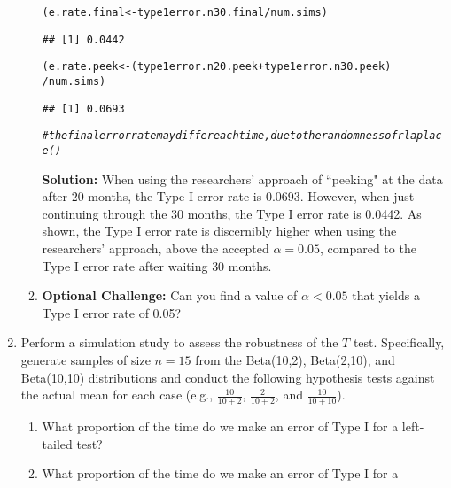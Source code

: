 \documentclass{article}\usepackage[]{graphicx}\usepackage[]{xcolor}
\makeatletter
\newcommand{\hlcom}[1]{\textcolor[rgb]{0.678,0.584,0.686}{\textit{#1}}}%
\newcommand{\hlopt}[1]{\textcolor[rgb]{0,0,0}{#1}}%
\newcommand{\hldef}[1]{\textcolor[rgb]{0.345,0.345,0.345}{#1}}%
\newcommand{\hlkwb}[1]{\textcolor[rgb]{0.69,0.353,0.396}{#1}}%
\newenvironment{kframe}{%
 \def\at@end@of@kframe{}%
 \ifinner\ifhmode%
  \def\at@end@of@kframe{\end{minipage}}%
  \begin{minipage}{\columnwidth}%
 \fi\fi%
 \def\FrameCommand##1{\hskip\@totalleftmargin \hskip-\fboxsep
 \colorbox{shadecolor}{##1}\hskip-\fboxsep
     \hskip-\linewidth \hskip-\@totalleftmargin \hskip\columnwidth}%
 \MakeFramed {\advance\hsize-\width
   \@totalleftmargin\z@ \linewidth\hsize
   \@setminipage}}%
 {\par\unskip\endMakeFramed%
 \at@end@of@kframe}
\newenvironment{knitrout}{}{} %
\makeatother
\begin{document}
\begin{enumerate}
\begin{enumerate}
\begin{knitrout}
\begin{kframe}
\begin{alltt}
\hldef{(e.rate.final} \hlkwb{<-} \hldef{type1error.n30.final}\hlopt{/}\hldef{num.sims)}
\end{alltt}
\begin{verbatim}
## [1] 0.0442
\end{verbatim}
\begin{alltt}
\hldef{(e.rate.peek} \hlkwb{<-} \hldef{(type1error.n20.peek} \hlopt{+} \hldef{type1error.n30.peek)}
              \hlopt{/}\hldef{num.sims)}
\end{alltt}
\begin{verbatim}
## [1] 0.0693
\end{verbatim}
\begin{alltt}
\hlcom{# the final error rate may differ each time, due to the randomness of rlaplace()}
\end{alltt}
\end{kframe}
\end{knitrout}
\textbf{Solution:} When using the researchers' approach of ``peeking" at the data after $20$ months, the Type I error rate is 0.0693. However, when just continuing through the $30$ months, the Type I error rate is 0.0442. As shown, the Type I error rate is discernibly higher when using the researchers' approach, above the accepted $\alpha = 0.05$, compared to the Type I error rate after waiting $30$ months.
\item \textbf{Optional Challenge:} Can you find a value of $\alpha<0.05$ that yields a 
  Type I error rate of 0.05?
\end{enumerate}
  \item Perform a simulation study to assess the robustness of the $T$ test. 
  Specifically, generate samples of size $n=15$ from the Beta(10,2), Beta(2,10), 
  and Beta(10,10) distributions and conduct the following hypothesis tests against 
  the actual mean for each case (e.g., $\frac{10}{10+2}$, $\frac{2}{10+2}$, and 
  $\frac{10}{10+10}$). 
  \begin{enumerate}
    \item What proportion of the time do we make an error of Type I for a
    left-tailed test?
    \item What proportion of the time do we make an error of Type I for a

\end{enumerate}
\end{enumerate}
\end{document}
